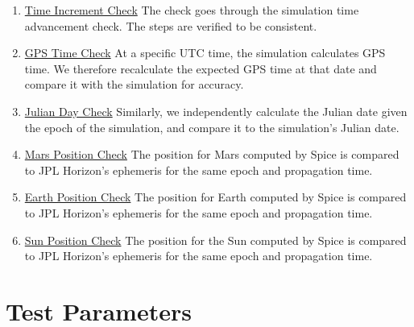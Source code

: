 \documentclass[]{BasiliskReportMemo}
\begin{document}
\begin{enumerate}
\item \underline{Time Increment Check} The check goes through the simulation time advancement check. The steps are verified to be consistent. 
\item \underline{GPS Time Check} At a specific UTC time, the simulation calculates GPS time. We therefore recalculate the expected GPS time at that date and compare it with the simulation for accuracy. 
\item \underline{Julian Day Check} Similarly, we independently calculate the Julian date given the epoch of the simulation, and compare it to the simulation's Julian date.
\item \underline{Mars Position Check} The position for Mars computed by Spice is compared to JPL Horizon's ephemeris for the same epoch and propagation time.
\item \underline{Earth Position Check} The position for Earth computed by Spice is compared to JPL Horizon's ephemeris for the same epoch and propagation time.
\item \underline{Sun Position Check} The position for the Sun computed by Spice is compared to JPL Horizon's ephemeris for the same epoch and propagation time.
\end{enumerate} 


\section{Test Parameters}
\end{document}
